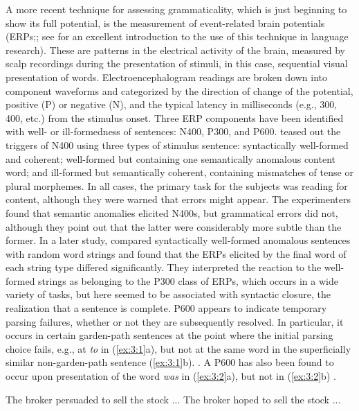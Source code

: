 A more recent technique for assessing grammaticality, which is just beginning to show its full potential, is the measurement of event-related brain potentials (ERPs;; see \citet{Garnsey1993} for an excellent introduction to the use of this technique in language research). These are patterns in the electrical activity of the brain, measured by scalp recordings during the presentation of stimuli, in this case, sequential visual presentation of words. Electroencephalogram readings are broken down into component waveforms and categorized by the direction of change of the potential, positive (P) or negative (N), and the typical latency in milliseconds (e.g., 300, 400, etc.) from the stimulus onset. Three ERP components have been identified with well- or ill-formedness of sentences: N400, P300, and P600. \citet{KutasEtAl1983} teased out the triggers of N400 using three types of stimulus sentence: syntactically well-formed and coherent; well-formed but containing one semantically anomalous content word; and ill-formed but semantically coherent, containing mismatches of tense or plural morphemes. In all cases, the primary task for the subjects was reading for content, although they
were warned that errors might appear. The experimenters found that semantic anomalies elicited N400s, but grammatical errors did not, although they point out that the latter were considerably more subtle than the former. In a later study,  \citet{VanPettenEtAl1991} compared syntactically well-formed anomalous sentences with random word strings and found that the ERPs elicited by the final word of each string type differed significantly. They interpreted the reaction to the well-formed strings as belonging to the P300 class of ERPs, which occurs in a wide variety of tasks, but here seemed to be associated with syntactic closure, the realization that a sentence is complete. P600 appears to indicate temporary parsing failures, whether or not they are subsequently resolved. In particular, it occurs in certain garden-path sentences at the point where the initial parsing choice fails, e.g., at \textit{to} in (\ref{ex:3:1}a), but not at the same word in the superficially similar non-garden-path sentence (\ref{ex:3:1}b).
\citep{OsterhoutEtAl1992}. A P600 has also been found to occur upon presentation of the word \textit{was} in (\ref{ex:3:2}a), but not in (\ref{ex:3:2}b) \citep{OsterhoutEtAl1994}.

\ea\label{ex:3:1}
\ea The broker persuaded to sell the stock ...
\ex The broker hoped to sell the stock ...
\z
\z

